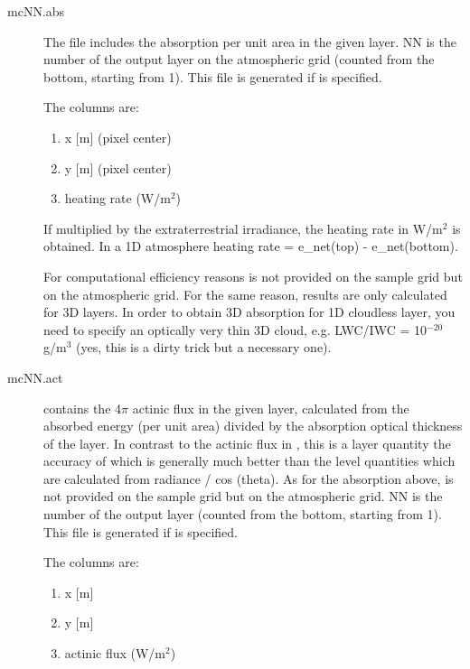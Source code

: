 \begin{description}
\item[mcNN.abs] 
  The file  includes the absorption per unit area in the given layer. 
  NN is the number of the output layer on the atmospheric 
  grid (counted from the bottom, starting from 1). This file is generated if  is specified.
  
  The columns are:
  \begin{enumerate}
  \item  x [m] (pixel center)
  \item  y [m] (pixel center)
  \item  heating rate (W/m$^2$)
  \end{enumerate} 
  
  If multiplied by the extraterrestrial irradiance, the heating rate
  in W/m$^2$ is obtained. In a 1D atmosphere heating rate = e\_net(top) - e\_net(bottom).

  For computational efficiency reasons  is not provided on the
  sample grid but on the atmospheric grid. For the same reason, results are 
  only calculated for 3D layers. In order to obtain 3D absorption for 1D
  cloudless layer, you need to specify an optically very thin 3D cloud, e.g.
  LWC/IWC = 10$^{-20}$ g/m$^3$ (yes, this is a dirty trick but a necessary one). 

\item[mcNN.act] 
   contains the 4$\pi$ actinic flux in the given layer,
  calculated from the absorbed energy (per unit area) divided by the 
  absorption optical thickness of the layer. In contrast to the 
  actinic flux in , this is a layer quantity the 
  accuracy of which is generally much better than the level quantities 
  which are calculated from radiance / cos (theta). As for the absorption
  above,  is not provided on the sample grid but on the
  atmospheric grid. NN is the number of the output layer (counted from the
  bottom, starting from 1). This file is generated if  is specified. 
    
  The columns are:
  \begin{enumerate}
  \item  x [m]
  \item  y [m]
  \item  actinic flux (W/m$^2$)
  \end{enumerate}

\end{description}  

